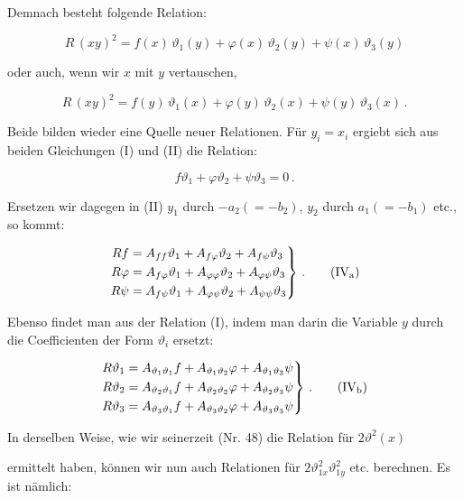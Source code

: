 \documentclass[11pt]{article}
\providecommand{\weberpage}[1]{}
\providecommand{\weq}[2]{\begin{equation}\tag{#1}#2\end{equation}}
\begin{document}
Demnach besteht folgende Relation:

\weq{I}{R\,(xy)^2 = f(x)\,\vartheta_1(y) + \varphi(x)\,\vartheta_2(y) + \psi(x)\,\vartheta_3(y)}

oder auch, wenn wir $x$ mit $y$ vertauschen,

\weq{II}{R\,(xy)^2 = f(y)\,\vartheta_1(x) + \varphi(y)\,\vartheta_2(x) + \psi(y)\,\vartheta_3(x)\,.}

Beide bilden wieder eine Quelle neuer Relationen. F\"ur $y_i = x_i$ ergiebt sich aus beiden Gleichungen (I) und (II) die Relation:

\weq{III}{f\vartheta_1 + \varphi\vartheta_2 + \psi\vartheta_3 = 0\,.}

Ersetzen wir dagegen in (II) $y_1$ durch $-a_2 (= -b_2)$, $y_2$ durch $a_1 (= -b_1)$ etc., so kommt:

\[
\left.
\begin{aligned}
R f &= A_{ff}\vartheta_1 + A_{f\varphi}\vartheta_2 + A_{f\psi}\vartheta_3 \\
R \varphi &= A_{f\varphi}\vartheta_1 + A_{\varphi\varphi}\vartheta_2 + A_{\varphi\psi}\vartheta_3 \\
R \psi &= A_{f\psi}\vartheta_1 + A_{\varphi\psi}\vartheta_2 + A_{\psi\psi}\vartheta_3
\end{aligned}
\right\}\,. \tag{IV$_\text{a}$}
\]

Ebenso findet man aus der Relation (I), indem man darin die Variable $y$ durch die Coefficienten der Form $\vartheta_i$ ersetzt:

\[
\left.
\begin{aligned}
R \vartheta_1 &= A_{\vartheta_1\vartheta_1} f + A_{\vartheta_1\vartheta_2}\varphi + A_{\vartheta_1\vartheta_3}\psi \\
R \vartheta_2 &= A_{\vartheta_2\vartheta_1} f + A_{\vartheta_2\vartheta_2}\varphi + A_{\vartheta_2\vartheta_3}\psi \\
R \vartheta_3 &= A_{\vartheta_3\vartheta_1} f + A_{\vartheta_3\vartheta_2}\varphi + A_{\vartheta_3\vartheta_3}\psi
\end{aligned}
\right\}\,. \tag{IV$_\text{b}$}
\]

In derselben Weise, wie wir seinerzeit (Nr. 48) die Relation f\"ur $2\vartheta^2(x)$


\weberpage{154}

ermittelt haben, k\"onnen wir nun auch Relationen f\"ur $2\vartheta^2_{1x}\vartheta^2_{1y}$ etc. berechnen. Es ist n\"amlich:
\end{document}

